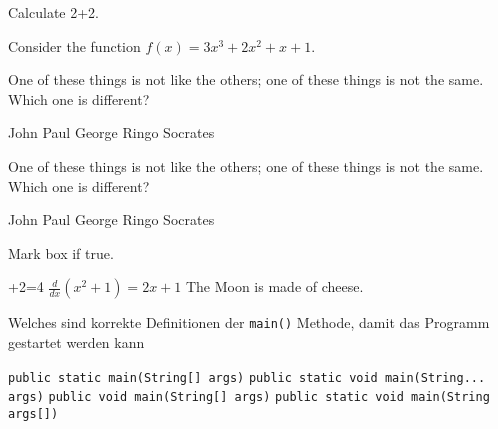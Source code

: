 \documentclass[12pt,a4paper]{exam}
\begin{document}
    \begin{questions}

        \question[1] Calculate 2+2.
        \addpoints

        \question[20] Consider the function $f(x)=3x^3+2x^2+x+1$.
        \noaddpoints %
        \addpoints

        \question[2] One of these things is not like the others; one of these
        things is not the same. Which one is different?
        \begin{choices}
            \choice John
            \choice Paul
            \choice George
            \choice Ringo
            \choice Socrates
        \end{choices}

        \question[2] One of these things is not like the others; one of these
        things is not the same. Which one is different?
        \begin{oneparchoices}
            \choice John
            \choice Paul
            \choice George
            \choice Ringo
            \choice Socrates
        \end{oneparchoices}

        \question[3] Mark box if true.
        \addpoints
        \begin{checkboxes}
            +2=4
            \choice $\frac{d}{dx} (x^2+1) = 2x+1$
            \choice The Moon is made of cheese.
        \end{checkboxes}

        {%
        \checkboxchar{$\Box$} %
        \question[4] Welches sind korrekte Definitionen der \texttt{main()} Methode,
        damit das Programm gestartet werden kann
        \addpoints
        \begin{checkboxes}
            \choice \texttt{public static main(String[] args)}
            \choice \texttt{public static void main(String... args)}
            \choice \texttt{public void main(String[] args)}
            \choice \texttt{public static void main(String args[])}
        \end{checkboxes}
        }%


\end{questions}
\end{document}
